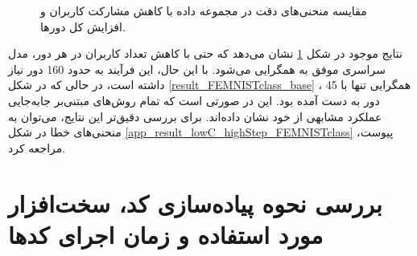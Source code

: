 \begin{figure}[h]
	\centering
	\hspace{0.8mm}
	\caption{
		مقایسه منحنی‌های دقت در مجموعه داده
		با کاهش مشارکت کاربران و افزایش  کل دورها.
	}
	\label{result_lowC_highStep_FEMNISTclass}
\end{figure}


نتایج موجود در شکل
\ref{result_lowC_highStep_FEMNISTclass}
نشان می‌دهد که حتی با کاهش تعداد کاربران در هر دور، مدل سراسری موفق به همگرایی می‌شود. با این حال، این فرآیند به حدود 160 دور نیاز داشته است، در حالی که در شکل
\ref{result_FEMNISTclass_base}%
، همگرایی تنها با 45 دور به دست آمده بود. این در صورتی است که تمام روش‌های مبتنی‌بر جابه‌جایی عملکرد مشابهی از خود نشان داده‌اند. برای بررسی دقیق‌تر این نتایج، می‌توان به منحنی‌های خطا در شکل
\ref{app_result_lowC_highStep_FEMNISTclass}
پیوست، مراجعه کرد.



\section{بررسی نحوه پیاده‌سازی کد، سخت‌افزار مورد استفاده و زمان اجرای کدها}

